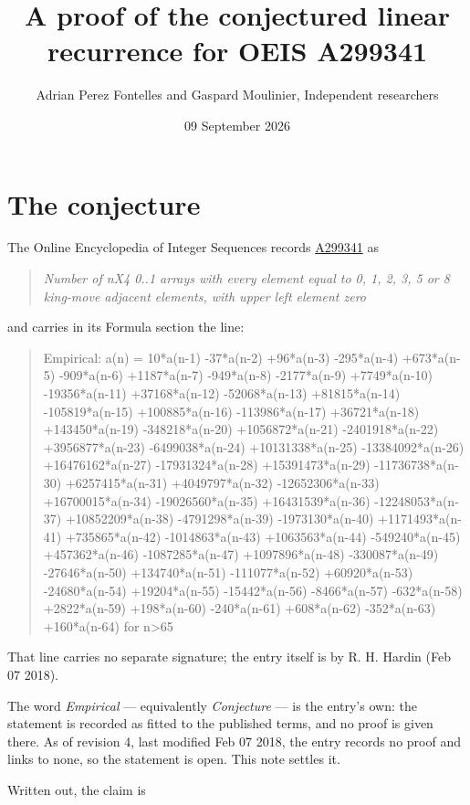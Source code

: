 \documentclass[11pt]{article}
\title{A proof of the conjectured linear recurrence for OEIS A299341}
\author{Adrian Perez Fontelles and Gaspard Moulinier, Independent researchers}
\date{09 September 2026}
\theoremstyle{definition}
\begin{document}
\maketitle
\section{The conjecture}

The Online Encyclopedia of Integer Sequences records \href{https://oeis.org/A299341}{A299341} as

\begin{quote}\itshape Number of nX4 0..1 arrays with every element equal to 0, 1, 2, 3, 5 or 8 king-move adjacent elements, with upper left element zero\end{quote}

and carries in its Formula section the line:

\begin{quote}\ttfamily Empirical: a(n) = 10*a(n-1) -37*a(n-2) +96*a(n-3) -295*a(n-4) +673*a(n-5) -909*a(n-6) +1187*a(n-7) -949*a(n-8) -2177*a(n-9) +7749*a(n-10) -19356*a(n-11) +37168*a(n-12) -52068*a(n-13) +81815*a(n-14) -105819*a(n-15) +100885*a(n-16) -113986*a(n-17) +36721*a(n-18) +143450*a(n-19) -348218*a(n-20) +1056872*a(n-21) -2401918*a(n-22) +3956877*a(n-23) -6499038*a(n-24) +10131338*a(n-25) -13384092*a(n-26) +16476162*a(n-27) -17931324*a(n-28) +15391473*a(n-29) -11736738*a(n-30) +6257415*a(n-31) +4049797*a(n-32) -12652306*a(n-33) +16700015*a(n-34) -19026560*a(n-35) +16431539*a(n-36) -12248053*a(n-37) +10852209*a(n-38) -4791298*a(n-39) -1973130*a(n-40) +1171493*a(n-41) +735865*a(n-42) -1014863*a(n-43) +1063563*a(n-44) -549240*a(n-45) +457362*a(n-46) -1087285*a(n-47) +1097896*a(n-48) -330087*a(n-49) -27646*a(n-50) +134740*a(n-51) -111077*a(n-52) +60920*a(n-53) -24680*a(n-54) +19204*a(n-55) -15442*a(n-56) -8466*a(n-57) -632*a(n-58) +2822*a(n-59) +198*a(n-60) -240*a(n-61) +608*a(n-62) -352*a(n-63) +160*a(n-64) for n>65\end{quote}

That line carries no separate signature; the entry itself is by R. H. Hardin (Feb 07 2018).

The word {\itshape Empirical} --- equivalently {\itshape Conjecture} --- is the entry's own: the statement is recorded as fitted to the published terms, and no proof is given there. As of revision 4, last modified Feb 07 2018, the entry records no proof and links to none, so the statement is open. This note settles it.

Written out, the claim is
\end{document}
